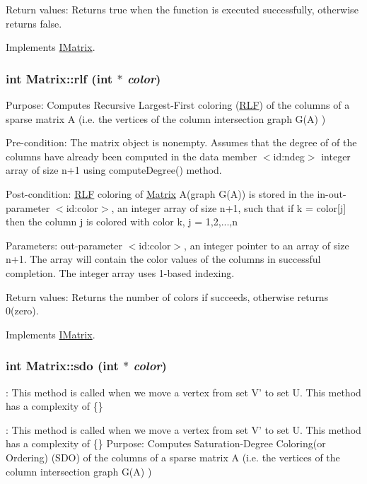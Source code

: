 Return values: Returns true when the function is executed successfully, otherwise returns false. 

Implements \hyperlink{classIMatrix}{IMatrix}.\hypertarget{classMatrix_a55f7c0c85880d58823dd77aeefbd046c}{
\subsubsection[{rlf}]{\setlength{\rightskip}{0pt plus 5cm}int Matrix::rlf (int $\ast$ {\em color})}}
\label{classMatrix_a55f7c0c85880d58823dd77aeefbd046c}
Purpose: Computes Recursive Largest-\/First coloring (\hyperlink{classRLF}{RLF}) of the columns of a sparse matrix A (i.e. the vertices of the column intersection graph G(A) )

Pre-\/condition: The matrix object is nonempty. Assumes that the degree of of the columns have already been computed in the data member $<$id:ndeg$>$ integer array of size n+1 using computeDegree() method.

Post-\/condition: \hyperlink{classRLF}{RLF} coloring of \hyperlink{classMatrix}{Matrix} A(graph G(A)) is stored in the in-\/out-\/parameter $<$id:color$>$, an integer array of size n+1, such that if k = color\mbox{[}j\mbox{]} then the column j is colored with color k, j = 1,2,...,n

Parameters: out-\/parameter $<$id:color$>$, an integer pointer to an array of size n+1. The array will contain the color values of the columns in successful completion. The integer array uses 1-\/based indexing.

Return values: Returns the number of colors if succeeds, otherwise returns 0(zero). 

Implements \hyperlink{classIMatrix}{IMatrix}.\hypertarget{classMatrix_a52e013055a3aef16751672815fc06600}{
\subsubsection[{sdo}]{\setlength{\rightskip}{0pt plus 5cm}int Matrix::sdo (int $\ast$ {\em color})}}
\label{classMatrix_a52e013055a3aef16751672815fc06600}
: This method is called when we move a vertex from set V' to set U. This method has a complexity of \{\}

: This method is called when we move a vertex from set V' to set U. This method has a complexity of \{\} Purpose: Computes Saturation-\/Degree Coloring(or Ordering) (SDO) of the columns of a sparse matrix A (i.e. the vertices of the column intersection graph G(A) )


